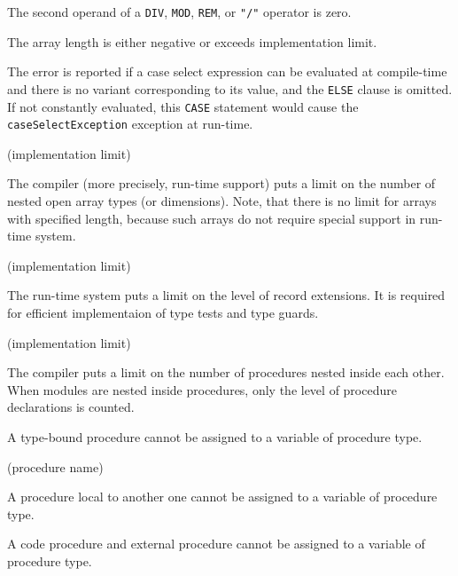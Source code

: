 The second operand of a \verb'DIV', \verb'MOD', \verb'REM', or \verb'"/"'
operator is zero.


The array length is either negative or exceeds implementation limit.


The error is reported if a case select expression can be evaluated at
compile-time and there is no variant corresponding to its value,
and the \verb'ELSE' clause is omitted. If not constantly evaluated,
this \verb'CASE' statement would cause the \verb'caseSelectException'
exception at run-time.

(implementation limit)

The compiler (more precisely, run-time support) puts a limit on the number
of nested open array types (or dimensions). Note, that there is no limit
for arrays with specified length, because such arrays do not require
special support in run-time system.

(implementation limit)

The run-time system puts a limit on the level of record extensions.
It is required for efficient implementaion of type tests and type guards.

(implementation limit)

The compiler puts a limit on the number of procedures nested inside each
other. When modules are nested inside procedures, only the level
of procedure declarations is counted.


A type-bound procedure cannot be assigned to a variable
of procedure type.

(procedure name)

A procedure local to another one cannot be assigned to a variable
of procedure type.


A code procedure and external procedure cannot be assigned to a
variable of procedure type.

